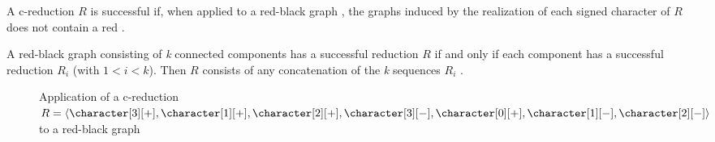A c-reduction $R$ is successful if, when applied to a red-black graph \grb{}, the graphs \grb[i] induced by the realization of each signed character \character[i][\pm] of $R$ does not contain a red \sg{}.

A red-black graph consisting of \textit{k} connected components has a successful reduction $R$ if and only if each component has a successful reduction $R_{i}$ (with $1 < i < k$).
Then $R$ consists of any concatenation of the \textit{k} sequences $R_{i}$ \cite{PPPptime2016}.

\begin{figure}[hp]
  

  \caption{Application of a c-reduction $R = \langle \character[3][+], \character[1][+], \character[2][+], \character[3][-], \character[0][+], \character[1][-], \character[2][-] \rangle$ to a red-black graph \grb{}}\label{figure:3}
\end{figure}
